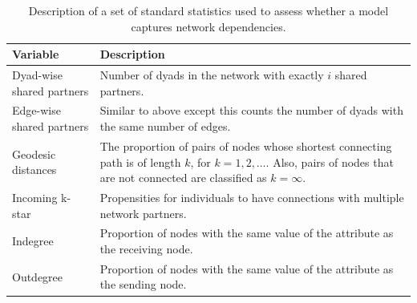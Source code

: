 \documentclass[12pt,onesided,pdflatex]{amsart}
\begin{document}
\begin{table}[ht]
\centering
\begingroup\scriptsize
\begin{tabular}{lL}
\footnotesize{\textbf{Variable}} & \footnotesize{\textbf{Description}} \\ \hline\hline
	Dyad-wise shared partners & Number of dyads in the network with exactly $i$ shared partners. \\
	Edge-wise shared partners & Similar to above except this counts the number of dyads with the same number of edges. \\
	Geodesic distances & The proportion of pairs of nodes whose shortest connecting path is of length $k$, for $k=1,2,\ldots$. Also, pairs of nodes that are not connected are classified as $k=\infty$. \\
	Incoming k-star & Propensities for individuals to have connections with multiple network partners. \\
	Indegree & Proportion of nodes with the same value of the attribute as the receiving node. \\
	Outdegree & Proportion of nodes with the same value of the attribute as the sending node. \\
\hline\hline
\end{tabular}
\endgroup
\caption{Description of a set of standard statistics used to assess whether a model captures network dependencies. }
\label{tab:netStat}
\end{table}
\FloatBarrier
\end{document}
